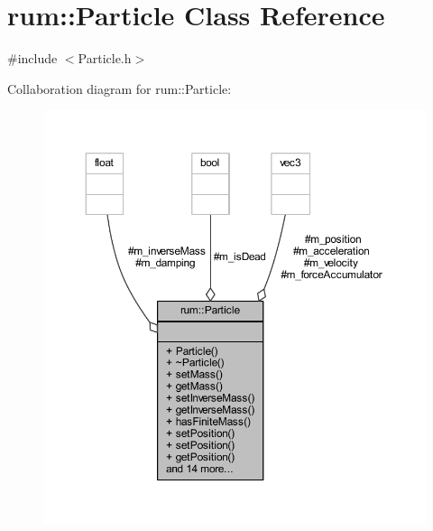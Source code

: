 \hypertarget{classrum_1_1_particle}{}\section{rum\+:\+:Particle Class Reference}
\label{classrum_1_1_particle}


{\ttfamily \#include $<$Particle.\+h$>$}



Collaboration diagram for rum\+:\+:Particle\+:\nopagebreak
\begin{figure}[H]
\begin{center}
\leavevmode
\includegraphics[width=350pt]{classrum_1_1_particle__coll__graph}
\end{center}
\end{figure}
